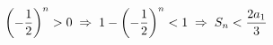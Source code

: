 \documentclass[preview]{standalone}
\begin{document}
\begin{align*}
\special{dvisvgm:raw <g id='unique000'>}\left(-\frac{1}{2}\right)^n>0 \;\Rightarrow\;  \special{dvisvgm:raw </g>}\special{dvisvgm:raw <g id='unique001'>}1-\left(-\frac{1}{2}\right)^n <1 \;\Rightarrow\; \special{dvisvgm:raw </g>}\special{dvisvgm:raw <g id='unique002'>}S_n<\frac{2a_1}{3}\special{dvisvgm:raw </g>}
\end{align*}
\end{document}
